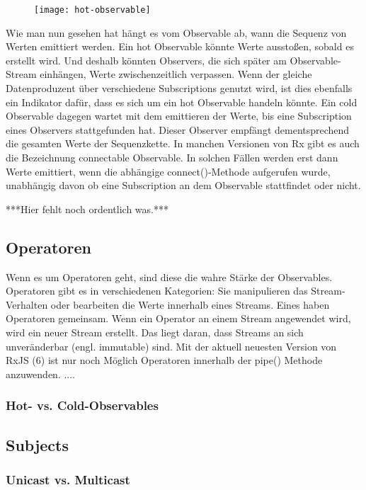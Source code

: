 \begin{figure}[H]
\begin{center}
\texttt{[image: hot-observable]}
\end{center}
\end{figure}



\noindent
Wie man nun gesehen hat hängt es vom Observable ab, wann die Sequenz von Werten emittiert werden. Ein hot Observable könnte Werte ausstoßen, sobald es erstellt wird. Und deshalb könnten Observers, die sich später am Observable-Stream einhängen, Werte zwischenzeitlich verpassen. Wenn der gleiche Datenproduzent über verschiedene Subscriptions genutzt wird, ist dies ebenfalls ein Indikator dafür, dass es sich um ein hot Observable handeln könnte. Ein cold Observable dagegen wartet mit dem emittieren der Werte, bis eine Subscription eines Observers stattgefunden hat. Dieser Observer empfängt dementsprechend die gesamten Werte der Sequenzkette. In manchen Versionen von Rx gibt es auch die Bezeichnung connectable Observable. In solchen Fällen werden erst dann Werte emittiert, wenn die abhängige connect()-Methode aufgerufen wurde, unabhängig davon ob eine Subscription an dem Observable stattfindet oder nicht.\cite{hot-vs-cold-part-2}

\noindent
\begin{center}
***Hier fehlt noch ordentlich was.*** 
\end{center}


\subsection{Operatoren}
Wenn es um Operatoren geht, sind diese die wahre Stärke der Observables. Operatoren gibt es in verschiedenen Kategorien: Sie manipulieren das Stream-Verhalten oder bearbeiten die Werte innerhalb eines Streams. Eines haben Operatoren gemeinsam. Wenn ein Operator an einem Stream angewendet wird, wird ein neuer Stream erstellt. Das liegt daran, dass Streams an sich unveränderbar (engl. immutable) sind.
Mit der aktuell neuesten Version von RxJS (6) ist nur noch Möglich Operatoren innerhalb der pipe() Methode anzuwenden.  ....

\subsubsection{Hot- vs. Cold-Observables}
\subsection{Subjects}
\subsubsection{Unicast vs. Multicast}









